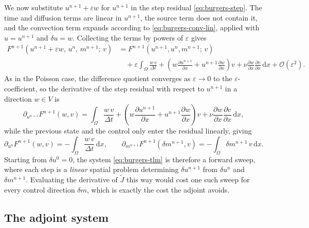 \documentclass[a4paper,11pt]{article}
\newcommand{\Om}{\Omega}
\newcommand{\dx}{\,\mathrm{d}x}
\newcommand{\Jt}{\tilde{J}}                  %
\theoremstyle{spacedplain} \newtheorem{theorem}[counter]{Theorem} \newtheorem{lemma}[counter]{Lemma} \newtheorem{prop}[counter]{Proposition} \newtheorem{cor}[counter]{Corollary}
\theoremstyle{spaceddefinition} \newtheorem{defn}[counter]{Definition} \newtheorem{example}[counter]{Example} \newtheorem{remark}[counter]{Remark}
\begin{document}
We now substitute $u^{n+1} + \varepsilon w$ for $u^{n+1}$ in the step residual \cref{eq:burgers-step}. The time and diffusion terms are linear in $u^{n+1}$, the source term does not contain it, and the convection term expands according to \cref{eq:burgers-conv-lin}, applied with $u = u^{n+1}$ and $\delta u = w$. Collecting the terms by powers of $\varepsilon$ gives
\begin{equation}
\begin{aligned}
  F^{n+1}(u^{n+1} + \varepsilon w,\, u^n,\, m^{n+1};\, v)
  &= F^{n+1}(u^{n+1}, u^n, m^{n+1};\, v) \\
  &\quad + \varepsilon \int_{\Om}
    \frac{w\, v}{\Delta t}
    + \left( w \frac{\partial u^{n+1}}{\partial x}
             + u^{n+1} \frac{\partial w}{\partial x} \right) v
    + \nu \frac{\partial w}{\partial x} \frac{\partial v}{\partial x}
    \dx
  + \mathcal{O}(\varepsilon^{2}).
\end{aligned}
\end{equation}
As in the Poisson case, the difference quotient converges as $\varepsilon \to 0$ to the $\varepsilon$-coefficient, so the derivative of the step residual with respect to $u^{n+1}$ in a direction $w \in V$ is
\begin{equation}
  \label{eq:burgers-dFdunew}
  \partial_{u^{n+1}} F^{n+1}(w, v)
  = \int_{\Om}
    \frac{w\, v}{\Delta t}
    + \left( w \frac{\partial u^{n+1}}{\partial x}
             + u^{n+1} \frac{\partial w}{\partial x} \right) v
    + \nu \frac{\partial w}{\partial x} \frac{\partial v}{\partial x}
    \dx,
\end{equation}
while the previous state and the control only enter the residual linearly, giving
\begin{equation}
  \label{eq:burgers-dFduold}
  \partial_{u^n} F^{n+1}(w, v) = -\int_{\Om} \frac{w\, v}{\Delta t} \dx,
  \qquad
  \partial_{m^{n+1}} F^{n+1}(\delta m^{n+1}, v) = -\int_{\Om} \delta m^{n+1}\, v \dx.
\end{equation}
Starting from $\delta u^0 = 0$, the system \cref{eq:burgers-tlm} is therefore a forward sweep, where each step is a \emph{linear} spatial problem determining $\delta u^{n+1}$ from $\delta u^n$ and $\delta m^{n+1}$. Evaluating the derivative of $\Jt$ this way would cost one such sweep for every control direction $\delta m$, which is exactly the cost the adjoint avoids.

\subsection{The adjoint system}
\label{sec:burgers-deriv:adjoint}
\end{document}
